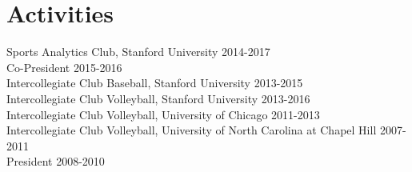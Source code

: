 \documentclass{article}
\begin{document}
\section*{\sc Activities}

Sports Analytics Club, Stanford University \hfill 2014-2017\\
{\color{gray} \indent Co-President \hfill 2015-2016}\\
Intercollegiate Club Baseball, Stanford University \hfill 2013-2015\\
Intercollegiate Club Volleyball, Stanford University \hfill 2013-2016\\
Intercollegiate Club Volleyball, University of Chicago \hfill 2011-2013\\
Intercollegiate Club Volleyball, University of North Carolina at Chapel Hill \hfill 2007-2011\\
{\color{gray} \indent President \hfill 2008-2010}
\end{document}
